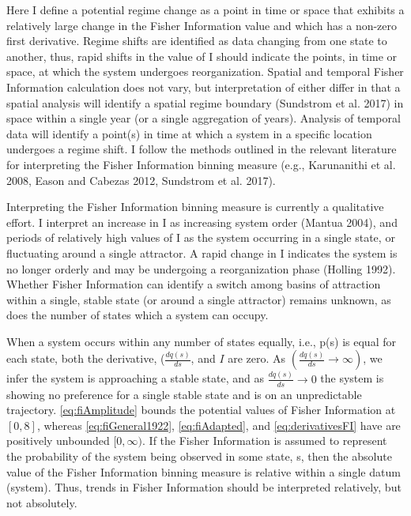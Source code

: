\documentclass[12pt,twoside,openany]{reedthesis}
\begin{document}
Here I define a potential regime change as a point in time or space that
exhibits a relatively large change in the Fisher Information value and
which has a non-zero first derivative. Regime shifts are identified as
data changing from one state to another, thus, rapid shifts in the value
of I should indicate the points, in time or space, at which the system
undergoes reorganization. Spatial and temporal Fisher Information
calculation does not vary, but interpretation of either differ in that a
spatial analysis will identify a spatial regime boundary (Sundstrom et
al. 2017) in space within a single year (or a single aggregation of
years). Analysis of temporal data will identify a point(s) in time at
which a system in a specific location undergoes a regime shift. I follow
the methods outlined in the relevant literature for interpreting the
Fisher Information binning measure (e.g., Karunanithi et al. 2008, Eason
and Cabezas 2012, Sundstrom et al. 2017).

Interpreting the Fisher Information binning measure is currently a
qualitative effort. I interpret an increase in I as increasing system
order (Mantua 2004), and periods of relatively high values of I as the
system occurring in a single state, or fluctuating around a single
attractor. A rapid change in I indicates the system is no longer orderly
and may be undergoing a reorganization phase (Holling 1992). Whether
Fisher Information can identify a switch among basins of attraction
within a single, stable state (or around a single attractor) remains
unknown, as does the number of states which a system can occupy.

When a system occurs within any number of states equally, i.e., p(s) is
equal for each state, both the derivative, (\(\frac{dq(s)}{ds}\), and
\(I\) are zero. As \((\frac{dq(s)}{ds} \rightarrow \infty)\), we infer
the system is approaching a stable state, and as
\(\frac{dq(s)}{ds} \rightarrow 0\) the system is showing no preference
for a single stable state and is on an unpredictable trajectory.
\eqref{eq:fiAmplitude} bounds the potential values of Fisher Information
at \([0, 8]\), whereas \eqref{eq:fiGeneral1922}, \eqref{eq:fiAdapted}, and
\eqref{eq:derivativesFI} have are positively unbounded \([0, \infty)\). If
the Fisher Information is assumed to represent the probability of the
system being observed in some state, s, then the absolute value of the
Fisher Information binning measure is relative within a single datum
(system). Thus, trends in Fisher Information should be interpreted
relatively, but not absolutely.
\end{document}
